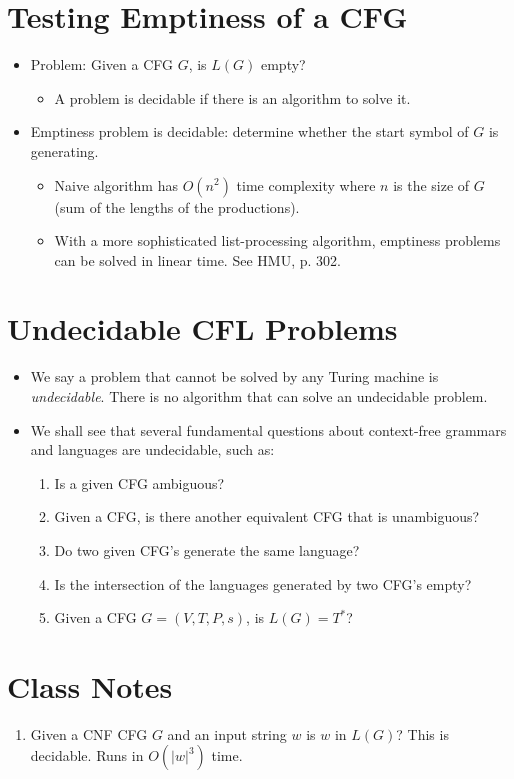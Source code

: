 \documentclass[]{article}
\begin{document}
\section{Testing Emptiness of a CFG}
  \begin{itemize}
    \item Problem: Given a CFG $G$, is $L(G)$ empty?
      \begin{itemize}
        \item A problem is decidable if there is an algorithm to solve it.
      \end{itemize}
    \item Emptiness problem is decidable: determine whether the start symbol of
    $G$ is generating.
      \begin{itemize}
        \item Naive algorithm has $O(n^2)$ time complexity where $n$ is the 
        size of $G$ (sum of the lengths of the productions).
        \item With a more sophisticated list-processing algorithm, emptiness 
        problems can be solved in linear time. See HMU, p. 302.
      \end{itemize}
  \end{itemize}
  
\section{Undecidable CFL Problems}
  \begin{itemize}
    \item We say a problem that cannot be solved by any Turing machine is
    \emph{undecidable}. There is no algorithm that can solve an undecidable
    problem.
    \item We shall see that several fundamental questions about context-free
    grammars and languages are undecidable, such as:
      \begin{enumerate}
        \item Is a given CFG ambiguous?
        \item Given a CFG, is there another equivalent CFG that is 
        unambiguous?
        \item Do two given CFG's generate the same language?
        \item Is the intersection of the languages generated by two CFG's 
        empty?
        \item Given a CFG $G = (V,T,P,s)$, is $L(G) = T^*$?
      \end{enumerate}
  \end{itemize}

\section{Class Notes}
  \begin{enumerate}
    \item Given a CNF CFG $G$ and an input string $w$ is $w$ in $L(G)$? This is
    decidable. Runs in $O(|w|^3)$ time.
  \end{enumerate}
\end{document}
